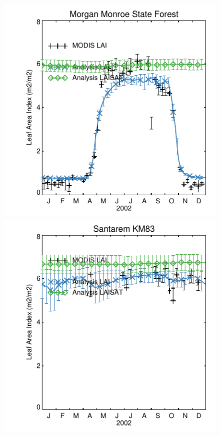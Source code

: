 \documentclass[a4paper,12pt]{article}
\begin{document}
\begin{figure}[hp]
\begin{center}
\includegraphics[scale=1.0]{Morgan_Monroe_State_Forest.dayplot.2002.LAI.MODIS.pdf}
\includegraphics[scale=1.0]{Santarem_KM83.dayplot.2002.LAI.MODIS.pdf}

\end{center}
\end{figure}
\end{document}
